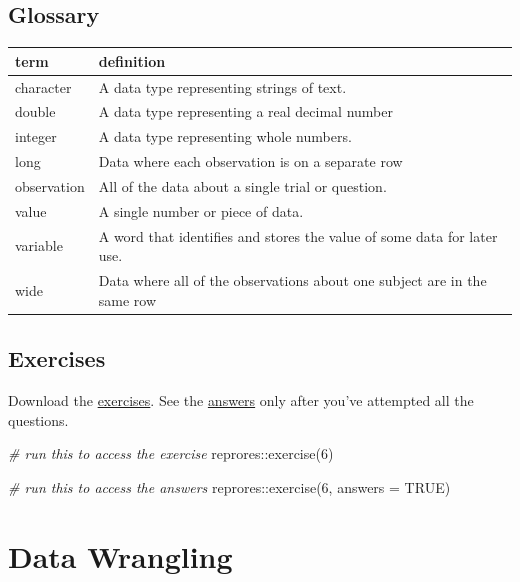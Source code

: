 \documentclass[
  oneside]{book}
\newenvironment{Shaded}{\begin{snugshade}}{\end{snugshade}}
\newcommand{\AttributeTok}[1]{\textcolor[rgb]{0.77,0.63,0.00}{#1}}
\newcommand{\CommentTok}[1]{\textcolor[rgb]{0.56,0.35,0.01}{\textit{#1}}}
\newcommand{\ConstantTok}[1]{\textcolor[rgb]{0.00,0.00,0.00}{#1}}
\newcommand{\DecValTok}[1]{\textcolor[rgb]{0.00,0.00,0.81}{#1}}
\newcommand{\FunctionTok}[1]{\textcolor[rgb]{0.00,0.00,0.00}{#1}}
\newcommand{\NormalTok}[1]{#1}
\newcommand{\SpecialCharTok}[1]{\textcolor[rgb]{0.00,0.00,0.00}{#1}}
\begin{document}
\hypertarget{glossary-tidyr}{%
\section{Glossary}\label{glossary-tidyr}}

\begin{tabular}{l|l}
\hline
term & definition\\
\hline
character & A data type representing strings of text.\\
\hline
double & A data type representing a real decimal number\\
\hline
integer & A data type representing whole numbers.\\
\hline
long & Data where each observation is on a separate row\\
\hline
observation & All of the data about a single trial or question.\\
\hline
value & A single number or piece of data.\\
\hline
variable & A word that identifies and stores the value of some data for later use.\\
\hline
wide & Data where all of the observations about one subject are in the same row\\
\hline
\end{tabular}

\hypertarget{exercises-tidyr}{%
\section{Exercises}\label{exercises-tidyr}}

Download the \href{exercises/06_tidyr_exercise.Rmd}{exercises}. See the \href{exercises/06_tidyr_answers.Rmd}{answers} only after you've attempted all the questions.

\begin{Shaded}
\begin{Highlighting}[]
\CommentTok{\# run this to access the exercise}
\NormalTok{reprores}\SpecialCharTok{::}\FunctionTok{exercise}\NormalTok{(}\DecValTok{6}\NormalTok{)}

\CommentTok{\# run this to access the answers}
\NormalTok{reprores}\SpecialCharTok{::}\FunctionTok{exercise}\NormalTok{(}\DecValTok{6}\NormalTok{, }\AttributeTok{answers =} \ConstantTok{TRUE}\NormalTok{)}
\end{Highlighting}
\end{Shaded}

\hypertarget{dplyr}{%
\chapter{Data Wrangling}\label{dplyr}}
\end{document}
